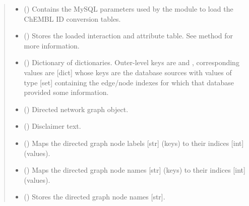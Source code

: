 \documentclass[letterpaper,10pt,english]{sphinxmanual}
\begin{document}
\begin{fulllineitems}
\begin{quote}
\begin{description}
\begin{itemize}
\item {} 
 () \textendash{} Contains the MySQL parameters used by the
 module to load the ChEMBL ID conversion
tables.

\item {} 
 () \textendash{} Stores the loaded interaction and attribute table. See
{\hyperref[\detokenize{main:pypath.main.PyPath.read_data_file}]{}} method for more information.

\item {} 
 () \textendash{} Dictionary of dictionaries. Outer-level keys are  and
, corresponding values are {[}dict{]} whose keys are the
database sources with values of type {[}set{]} containing the
edge/node indexes for which that database provided some
information.

\item {} 
 () \textendash{} Directed network graph object.

\item {} 
 () \textendash{} Disclaimer text.

\item {} 
 () \textendash{} Maps the directed graph node labels {[}str{]} (keys) to their
indices {[}int{]} (values).

\item {} 
 () \textendash{} Maps the directed graph node names {[}str{]} (keys) to their indices
{[}int{]} (values).

\item {} 
 () \textendash{} Stores the directed graph node names {[}str{]}.


\end{itemize}
\end{description}
\end{quote}
\end{fulllineitems}
\end{document}
